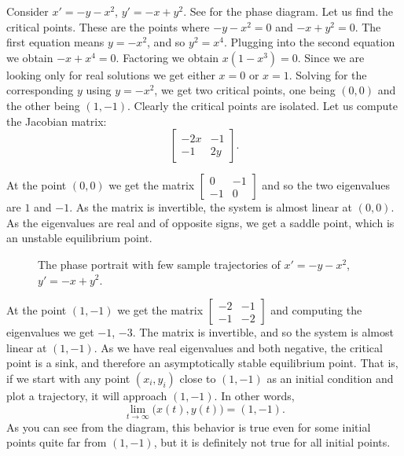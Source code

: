 \documentclass[12pt]{book}
\begin{document}
\begin{example} \label{example:nlin-xplusy}
Consider
$x'=-y-x^2$,
$y'=-x+y^2$.
See  for the phase diagram.
Let us find the critical points.  These are the points where
$-y-x^2 = 0$ and $-x+y^2=0$.  The first equation means $y = -x^2$, and
so $y^2 = x^4$.  Plugging into the second equation we obtain 
$-x+x^4 = 0$.  Factoring we obtain $x(1-x^3)=0$.  Since we are looking only
for real solutions we get either $x=0$ or $x=1$.  Solving for the
corresponding $y$ using $y = -x^2$, we get two critical points, one being $(0,0)$
and the other being $(1,-1)$.  Clearly the critical points are isolated.
Let us compute the Jacobian matrix:
\begin{equation*}
\begin{bmatrix}
-2x & -1 \\
-1 & 2y
\end{bmatrix} .
\end{equation*}

At the point $(0,0)$ we get the matrix
$\left[ \begin{smallmatrix} 0 & -1 \\ -1 & 0 \end{smallmatrix} \right]$ and
so the two eigenvalues are $1$ and $-1$.  As the matrix is invertible, the system is almost linear
at $(0,0)$.  As the eigenvalues are real
and of opposite signs, we get a saddle point, which is an unstable
equilibrium point.

\begin{figure}[h!t]
\capstart
\begin{center}
\caption{The phase portrait with few sample trajectories of 
$x'=-y-x^2$, $y'=-x+y^2$.  \label{fig:nlin-ex813-new}}
\end{center}
\end{figure}
At the point $(1,-1)$ we get the matrix
$\left[ \begin{smallmatrix} -2 & -1 \\ -1 & -2 \end{smallmatrix} \right]$ and
computing the eigenvalues we get $-1$, $-3$.
The matrix is invertible, and so the system is almost linear at $(1,-1)$.
As we have real eigenvalues and both negative, the critical
point is a sink, and therefore an asymptotically stable equilibrium point.
That is, if we start with any point $(x_i,y_i)$ close to $(1,-1)$ as
an initial condition and plot a trajectory, it will approach $(1,-1)$.
In other words,
\begin{equation*}
\lim_{t \to \infty} \bigl( x(t), y(t) \bigr) = (1,-1) .
\end{equation*}
As you can 
see from the diagram, this behavior is true even for some
initial points quite far from $(1,-1)$, but it is definitely not true for all
initial points.
\end{example}
\end{document}
